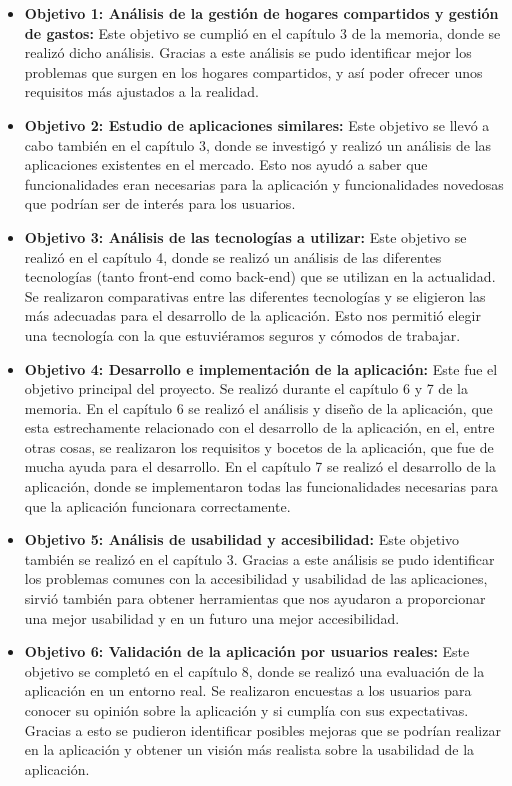 \begin{itemize}
     \item \textbf{Objetivo 1: Análisis de la gestión de hogares compartidos y gestión de gastos:} Este objetivo se cumplió en el capítulo 3 de la memoria, donde se realizó dicho análisis. Gracias a este análisis se pudo identificar mejor los problemas que surgen en los hogares compartidos, y así poder ofrecer unos requisitos más ajustados a la realidad.
     \item \textbf{Objetivo 2: Estudio de aplicaciones similares:} Este objetivo se llevó a cabo también en el capítulo 3, donde se investigó y realizó un análisis de las aplicaciones existentes en el mercado. Esto nos ayudó a saber que funcionalidades eran necesarias para la aplicación y funcionalidades novedosas que podrían ser de interés para los usuarios.
     \item \textbf{Objetivo 3: Análisis de las tecnologías a utilizar:} Este objetivo se realizó en el capítulo 4, donde se realizó un análisis de las diferentes tecnologías (tanto front-end como back-end) que se utilizan en la actualidad. Se realizaron comparativas entre las diferentes tecnologías y se eligieron las más adecuadas para el desarrollo de la aplicación. Esto nos permitió elegir una tecnología con la que estuviéramos seguros y cómodos de trabajar.
     \item \textbf{Objetivo 4: Desarrollo e implementación de la aplicación:} Este fue el objetivo principal del proyecto. Se realizó durante el capítulo 6 y 7 de la memoria. En el capítulo 6 se realizó el análisis y diseño de la aplicación, que esta estrechamente relacionado con el desarrollo de la aplicación, en el, entre otras cosas, se realizaron los requisitos y bocetos de la aplicación, que fue de mucha ayuda para el desarrollo. En el capítulo 7 se realizó el desarrollo de la aplicación, donde se implementaron todas las funcionalidades necesarias para que la aplicación funcionara correctamente.
     \item \textbf{Objetivo 5: Análisis de usabilidad y accesibilidad:} Este objetivo también se realizó en el capítulo 3. Gracias a este análisis se pudo identificar los problemas comunes con la accesibilidad y usabilidad de las aplicaciones, sirvió también para obtener herramientas que nos ayudaron a proporcionar una mejor usabilidad y en un futuro una mejor accesibilidad.
     \item \textbf{Objetivo 6: Validación de la aplicación por usuarios reales:} Este objetivo se completó en el capítulo 8, donde se realizó una evaluación de la aplicación en un entorno real. Se realizaron encuestas a los usuarios para conocer su opinión sobre la aplicación y si cumplía con sus expectativas. Gracias a esto se pudieron identificar posibles mejoras que se podrían realizar en la aplicación y obtener un visión más realista sobre la usabilidad de la aplicación.
\end{itemize}


